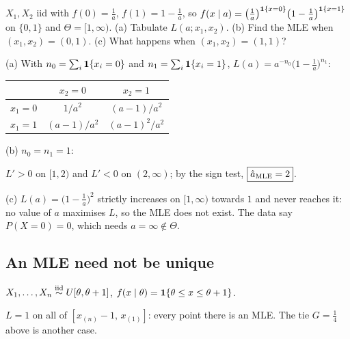 \begin{example}
$X_1,X_2$ iid with $f(0)=\frac1a$, $f(1)=1-\frac1a$, so $f(x\mid a)=\big(\frac1a\big)^{\mathbf{1}\{x=0\}}\big(1-\frac1a\big)^{\mathbf{1}\{x=1\}}$ on $\{0,1\}$ and $\Theta=[1,\infty)$.
(a) Tabulate $L(a;x_1,x_2)$. (b) Find the MLE when $(x_1,x_2)=(0,1)$. (c) What happens when $(x_1,x_2)=(1,1)$?

(a) With $n_0=\sum_i\mathbf{1}\{x_i=0\}$ and $n_1=\sum_i\mathbf{1}\{x_i=1\}$, $L(a)=a^{-n_0}\big(1-\frac1a\big)^{n_1}$:
\begin{center}
\begin{tabular}{@{}lcc@{}}
\toprule
 & $x_2=0$ & $x_2=1$\\
\midrule
$x_1=0$ & $1/a^2$ & $(a-1)/a^2$\\
$x_1=1$ & $(a-1)/a^2$ & $(a-1)^2/a^2$\\
\bottomrule
\end{tabular}
\end{center}
(b) $n_0=n_1=1$:
\begin{deriv}
\end{deriv}
$L'>0$ on $[1,2)$ and $L'<0$ on $(2,\infty)$; by the sign test, $\boxed{\hat a_{\mathrm{MLE}}=2}$.

(c) $L(a)=\big(1-\frac1a\big)^2$ strictly increases on $[1,\infty)$ towards $1$ and never reaches it: no value of $a$ maximises $L$, so the MLE does not exist. The data say $P(X=0)=0$, which needs $a=\infty\notin\Theta$.
\end{example}

\subsection*{An MLE need not be unique}

\begin{example}
$X_1,\dots,X_n\overset{\text{iid}}{\sim} U[\theta,\theta+1]$, $f(x\mid\theta)=\mathbf{1}\{\theta\le x\le\theta+1\}$.
\begin{deriv}
\end{deriv}
$L=1$ on all of $[x_{(n)}-1,\,x_{(1)}]$: every point there is an MLE. The tie $G=\frac14$ above is another case.
\end{example}

